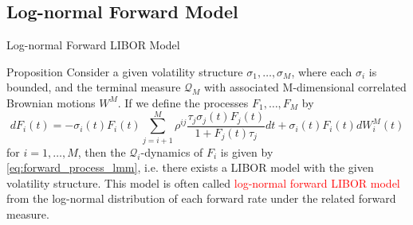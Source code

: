 \documentclass{beamer}
\begin{document}
\subsection{Log-normal Forward Model}
\begin{frame}{Log-normal Forward LIBOR Model}
  \begin{block}{Proposition}
    Consider a given volatility structure $\sigma_1,\ldots, \sigma_M$, where each $\sigma_i$ is bounded, and the terminal measure $\mathcal{Q}_M$ with associated M-dimensional correlated Brownian motions $W^M$. If we define the processes $F_1,\ldots, F_M$ by
    \begin{equation}
      dF_i(t) = -\sigma_i(t)F_i(t)\sum_{j=i+1}^M \rho^{ij} \frac{\tau_j\sigma_j(t)F_j(t)}{1+F_j(t)\tau_j} dt + \sigma_i(t)F_i(t)dW^M_i(t)
    \end{equation}
    for $i = 1,\ldots, M$, then the $\mathcal{Q}_i$-dynamics of $F_i$ is given by \cref{eq:forward_process_lmm}, i.e. there exists a LIBOR model with the given volatility structure.
  This model is often called \textcolor{red}{log-normal forward LIBOR model} from the log-normal distribution of each forward rate under the related forward measure.
  \end{block}
\end{frame}

\end{document}
